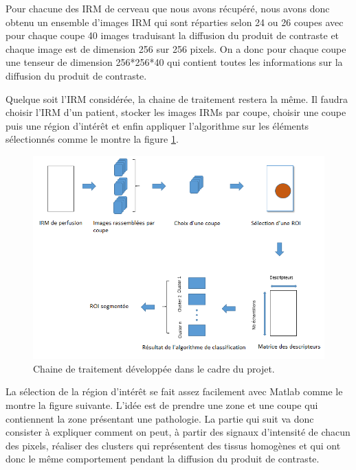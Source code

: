 Pour chacune des IRM de cerveau que nous avons récupéré, nous avons donc obtenu un ensemble d'images IRM qui sont réparties selon 24 ou 26 coupes avec pour chaque coupe 40 images traduisant la diffusion du produit de contraste et chaque image est de dimension 256 sur 256 pixels. On a donc pour chaque coupe une tenseur de dimension 256*256*40 qui contient toutes les informations sur la diffusion du produit de contraste.

\medskip

Quelque soit l'IRM considérée, la chaine de traitement restera la même. Il faudra choisir l'IRM d'un patient, stocker les images IRMs par coupe, choisir une coupe puis une région d'intérêt et enfin appliquer l'algorithme sur les éléments sélectionnés comme le montre la figure \ref{fig:toolchain}.


\begin{figure}[H]
\centering
    \includegraphics[scale=0.8,angle=0]{Images/Processing_toolchain.png}
    \caption{Chaine de traitement développée dans le cadre du projet.}
    \label{fig:toolchain}
\end{figure}


La sélection de la région d'intérêt se fait assez facilement avec Matlab comme le montre la figure suivante. L'idée est de prendre une zone et une coupe qui contiennent la zone présentant une pathologie. La partie qui suit va donc consister à expliquer comment on peut, à partir des signaux d'intensité de chacun des pixels, réaliser des clusters qui représentent des tissus homogènes et qui ont donc le même comportement pendant la diffusion du produit de contraste.

